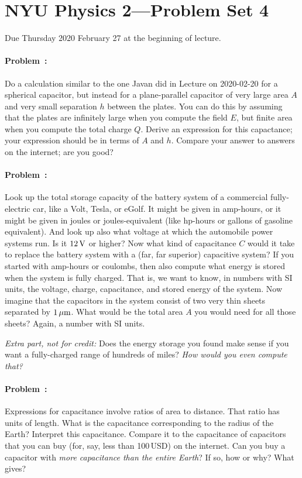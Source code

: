 \documentclass[12pt]{article}
\begin{document}
\section*{NYU Physics 2---Problem Set 4}

Due Thursday 2020 February 27 at the beginning of lecture.

\paragraph{Problem~\theproblem:}%
Do a calculation similar to the one Javan did in Lecture on 2020-02-20
for a spherical capacitor, but instead for a plane-parallel capacitor
of very large area $A$ and very small separation $h$ between the
plates. You can do this by assuming that the plates are infinitely
large when you compute the field $E$, but finite area when you compute the
total charge $Q$. Derive an expression for this capactance; your
expression should be in terms of $A$ and $h$. Compare your answer to
answers on the internet; are you good?

\paragraph{Problem~\theproblem:}%
Look up the total storage capacity of the battery system of a
commercial fully-electric car, like a Volt, Tesla, or eGolf. It might
be given in amp-hours, or it might be given in joules or
joules-equivalent (like hp-hours or gallons of gasoline
equivalent). And look up also what voltage at which the automobile
power systems run. Is it $12\,\mathrm{V}$ or higher? Now what kind of
capacitance $C$ would it take to replace the battery system with a
(far, far superior) capacitive system? If you started with amp-hours
or coulombs, then also compute what energy is stored when the system
is fully charged. That is, we want to know, in numbers with SI units, the voltage,
charge, capacitance, and stored energy of the system. Now imagine that
the capacitors in the system consist of two very thin sheets separated
by $1\,\mathrm{\mu m}$.  What would be the total area $A$ you would need for all
those sheets? Again, a number with SI units.

\emph{Extra part, not for credit:} Does the energy storage you found
make sense if you want a fully-charged range of hundreds of miles? \emph{How
would you even compute that?}

\paragraph{Problem~\theproblem:}%
Expressions for capacitance involve ratios of area to distance.  That
ratio has units of length. What is the capacitance corresponding to
the radius of the Earth? Interpret this capacitance. Compare it to the
capacitance of capacitors that you can buy (for, say, less than
100\,USD) on the internet. Can you buy a capacitor with \emph{more
  capacitance than the entire Earth}? If so, how or why? What gives?
\end{document}
